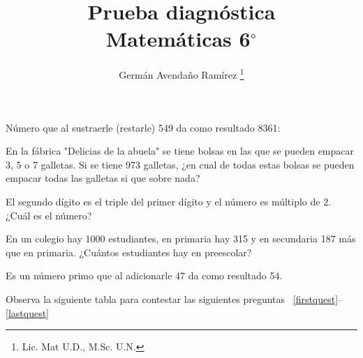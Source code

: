 \documentclass[10pt,letterpaper,addpoints]{exam}
\begin{document}
\title{Prueba diagnóstica\\Matem\'{a}ticas 6$^\circ$}
\author{Germ\'{a}n Avendaño Ram\'{i}rez \thanks{Lic. Mat U.D., M.Sc. U.N.}}
\date{}
\maketitle
\begin{center}
\end{center}
\begin{questions}
\question
Número que al sustraerle (restarle) 549 da como resultado 8361:

\begin{oneparchoices}
\end{oneparchoices}
\question
En la fábrica "Delicias de la abuela" se tiene bolsas en las que se pueden empacar 3, 5 o 7 galletas. Si se tiene 973 galletas, ¿en cual de todas estas bolsas se pueden empacar todas las galletas si que sobre nada?

\begin{oneparchoices}
\end{oneparchoices}
\question
El segundo dígito es el triple del primer dígito y el número es múltiplo de 2. ¿Cuál es el número?

\begin{oneparchoices}
\end{oneparchoices}
\question 
En un colegio hay 1000 estudiantes, en primaria hay 315 y en secundaria 187 más que en primaria. ¿Cuántos estudiantes hay en preescolar?

\begin{oneparchoices}
\end{oneparchoices}
\question
Es un n\'umero primo que al adicionarle 47 da como resultado 54.

\begin{oneparchoices}
\end{oneparchoices}

\begin{minipage}{.4\textwidth}{Observa la siguiente tabla para contestar las siguientes preguntas ~\ref{firstquest}--\ref{lastquest}

}
\end{minipage}
\end{questions}
\end{document}
